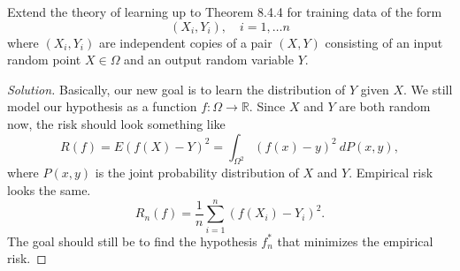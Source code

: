 \documentclass[11pt,letterpaper]{report}
\newcommand{\reals}{\mathbb{R}}
\newenvironment{solution}
{\begin{proof}[Solution]}
{\end{proof}}
\begin{document}
Extend the theory of learning up to Theorem 8.4.4 for training data of the form
\[
(X_i, Y_i),\quad i=1, \ldots n
\]
where $(X_i, Y_i)$ are independent copies of a pair $(X,Y)$ consisting of an input random point $X\in \Omega$ and an output random variable $Y$.
\begin{solution}
	Basically, our new goal is to learn the distribution of $Y$ given $X$. We still model our hypothesis as a function $f:\Omega\to \reals$. Since $X$ and $Y$ are both random now, the risk should look something like
	\[
	R(f) = E(f(X)-Y)^2 = \int_{\Omega^2}(f(x)-y)^2\ dP(x,y),
	\]
	where $P(x,y)$ is the joint probability distribution of $X$ and $Y$. Empirical risk looks the same.
	\[
	R_n(f) = \frac{1}{n}\sum_{i=1}^n(f(X_i)-Y_i)^2.
	\]
	The goal should still be to find the hypothesis $f_n^*$ that minimizes the empirical risk.
\end{solution}
\end{document}
